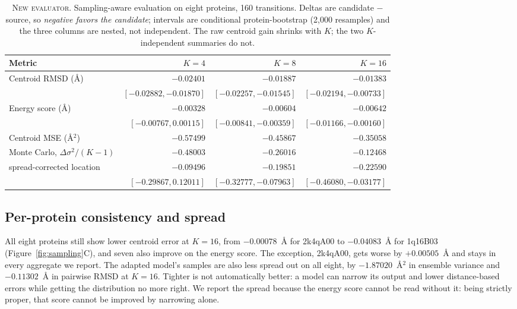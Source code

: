 \documentclass{article}
\begin{document}
\begin{table}[tb]
\centering
\caption{\textsc{New evaluator.} Sampling-aware evaluation on eight proteins, 160 transitions. Deltas are candidate $-$ source, so \emph{negative favors the candidate}; intervals are conditional protein-bootstrap (2{,}000 resamples) and the three columns are nested, not independent. The raw centroid gain shrinks with $K$; the two $K$-independent summaries do not.}
\label{tab:sampling}
\scriptsize
\begin{tabular}{lrrr}
\toprule
Metric & $K=4$ & $K=8$ & $K=16$ \\
\midrule
Centroid RMSD (\AA)          & $-0.02401$ & $-0.01887$ & $-0.01383$ \\
                             & \tiny$[-0.02882, -0.01870]$ & \tiny$[-0.02257, -0.01545]$ & \tiny$[-0.02194, -0.00733]$ \\
Energy score (\AA)           & $-0.00328$ & $-0.00604$ & $-0.00642$ \\
                             & \tiny$[-0.00767, 0.00115]$ & \tiny$[-0.00841, -0.00359]$ & \tiny$[-0.01166, -0.00160]$ \\
\midrule
Centroid MSE (\AA$^2$)       & $-0.57499$ & $-0.45867$ & $-0.35058$ \\
\quad Monte Carlo, $\Delta\sigma^2/(K{-}1)$ & $-0.48003$ & $-0.26016$ & $-0.12468$ \\
\quad spread-corrected location & $-0.09496$ & $-0.19851$ & $-0.22590$ \\
                             & \tiny$[-0.29867, 0.12011]$ & \tiny$[-0.32777, -0.07963]$ & \tiny$[-0.46080, -0.03177]$ \\
\bottomrule
\end{tabular}
\end{table}

\subsection{Per-protein consistency and spread}

All eight proteins still show lower centroid error at $K=16$, from $-0.00078$~\AA{} for 2k4qA00 to $-0.04083$~\AA{} for 1q16B03 (Figure~\ref{fig:sampling}C), and seven also improve on the energy score. The exception, 2k4qA00, gets worse by $+0.00505$~\AA{} and stays in every aggregate we report. The adapted model's samples are also less spread out on all eight, by $-1.87020$~\AA$^2$ in ensemble variance and $-0.11302$~\AA{} in pairwise RMSD at $K=16$. Tighter is not automatically better: a model can narrow its output and lower distance-based errors while getting the distribution no more right. We report the spread because the energy score cannot be read without it: being strictly proper, that score cannot be improved by narrowing alone.
\end{document}
